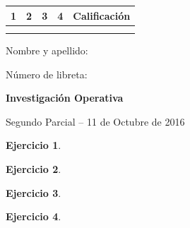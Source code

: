 \documentclass[a4paper,oneside,12pt]{amsart}
\newcommand{\nombremateria}
{Investigaci\'on Operativa}
\newcommand{\numeroparcial}
    { Segundo Parcial }
\newcommand{\fecha}
    {11 de Octubre de 2016}
\newtheorem{quest}{Ejercicio}
\begin{document}
\hfill \hfill
\begin{tabular}[c]{|c|c|c|c|c|}
\hline 
1 & 2 & 3 & 4 & Calificaci\'on \\ \hline \hline
\hspace{1.2 cm} & \hspace{1.2 cm} & \hspace{1.2 cm} & \hspace{1.2 cm} &\hspace{1.5 cm} \\
\hspace{1.2 cm} & \hspace{1.2 cm} & \hspace{1.2 cm} & \hspace{1.2 cm} &\hspace{1.5 cm} \\ \hline

\end{tabular}

\vspace{-1cm}

\noindent Nombre y apellido:

\vspace{0.2cm}

\noindent Número de libreta:

\noindent \hrulefill 

\smallskip
\renewcommand{\baselinestretch}{1.1}

\begin{center}
	\large \textbf{\nombremateria} 
	
	\numeroparcial -- \fecha
\end{center}

\vspace{.6cm}
\renewcommand{\theenumi}{\textbf{\arabic{enumi}}}


\begin{quest} 


\end{quest}



\begin{quest} 


\end{quest}




\begin{quest} 


\end{quest}




\begin{quest} 


\end{quest}


\end{document}
